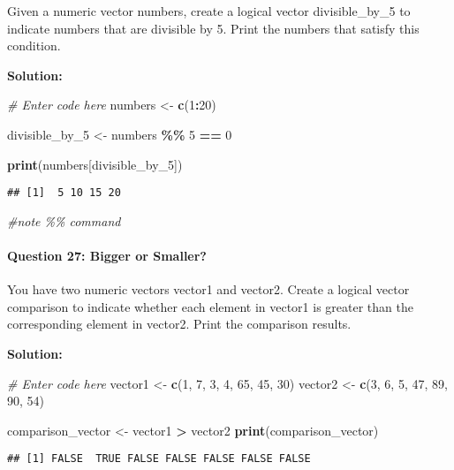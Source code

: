 \documentclass[
]{article}
\newenvironment{Shaded}{\begin{snugshade}}{\end{snugshade}}
\newcommand{\CommentTok}[1]{\textcolor[rgb]{0.56,0.35,0.01}{\textit{#1}}}
\newcommand{\DecValTok}[1]{\textcolor[rgb]{0.00,0.00,0.81}{#1}}
\newcommand{\FunctionTok}[1]{\textcolor[rgb]{0.13,0.29,0.53}{\textbf{#1}}}
\newcommand{\NormalTok}[1]{#1}
\newcommand{\OtherTok}[1]{\textcolor[rgb]{0.56,0.35,0.01}{#1}}
\newcommand{\SpecialCharTok}[1]{\textcolor[rgb]{0.81,0.36,0.00}{\textbf{#1}}}
\begin{document}
Given a numeric vector numbers, create a logical vector divisible\_by\_5
to indicate numbers that are divisible by 5. Print the numbers that
satisfy this condition.

\textbf{Solution:}

\begin{Shaded}
\begin{Highlighting}[]
\CommentTok{\# Enter code here}
\NormalTok{numbers }\OtherTok{\textless{}{-}} \FunctionTok{c}\NormalTok{(}\DecValTok{1}\SpecialCharTok{:}\DecValTok{20}\NormalTok{)}

\NormalTok{divisible\_by\_5 }\OtherTok{\textless{}{-}}\NormalTok{ numbers }\SpecialCharTok{\%\%} \DecValTok{5} \SpecialCharTok{==} \DecValTok{0}

\FunctionTok{print}\NormalTok{(numbers[divisible\_by\_5])}
\end{Highlighting}
\end{Shaded}

\begin{verbatim}
## [1]  5 10 15 20
\end{verbatim}

\begin{Shaded}
\begin{Highlighting}[]
\CommentTok{\#note \%\% command}
\end{Highlighting}
\end{Shaded}

\hypertarget{question-27-bigger-or-smaller}{%
\paragraph{Question 27: Bigger or
Smaller?}\label{question-27-bigger-or-smaller}}

You have two numeric vectors vector1 and vector2. Create a logical
vector comparison to indicate whether each element in vector1 is greater
than the corresponding element in vector2. Print the comparison results.

\textbf{Solution:}

\begin{Shaded}
\begin{Highlighting}[]
\CommentTok{\# Enter code here}
\NormalTok{vector1 }\OtherTok{\textless{}{-}} \FunctionTok{c}\NormalTok{(}\DecValTok{1}\NormalTok{, }\DecValTok{7}\NormalTok{, }\DecValTok{3}\NormalTok{, }\DecValTok{4}\NormalTok{, }\DecValTok{65}\NormalTok{, }\DecValTok{45}\NormalTok{, }\DecValTok{30}\NormalTok{)}
\NormalTok{vector2 }\OtherTok{\textless{}{-}} \FunctionTok{c}\NormalTok{(}\DecValTok{3}\NormalTok{, }\DecValTok{6}\NormalTok{, }\DecValTok{5}\NormalTok{, }\DecValTok{47}\NormalTok{, }\DecValTok{89}\NormalTok{, }\DecValTok{90}\NormalTok{, }\DecValTok{54}\NormalTok{)}

\NormalTok{comparison\_vector }\OtherTok{\textless{}{-}}\NormalTok{ vector1 }\SpecialCharTok{\textgreater{}}\NormalTok{ vector2}
\FunctionTok{print}\NormalTok{(comparison\_vector)}
\end{Highlighting}
\end{Shaded}

\begin{verbatim}
## [1] FALSE  TRUE FALSE FALSE FALSE FALSE FALSE
\end{verbatim}
\end{document}
